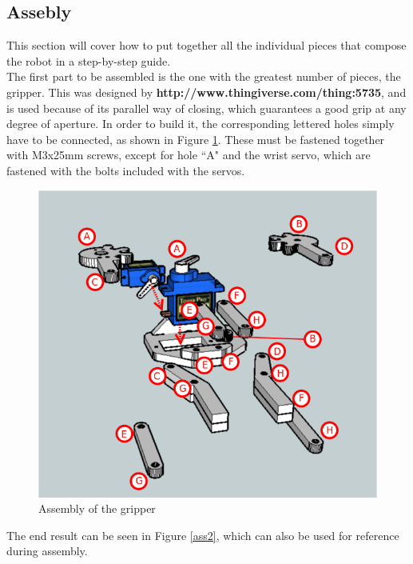 \subsection{Assebly}

This section will cover how to put together all the individual pieces that compose the robot in a step-by-step guide.\\


The first part to be assembled is the one with the greatest number of pieces, the gripper. This was designed by \textbf{http://www.thingiverse.com/thing:5735}, and is used because of its parallel way of closing, which guarantees a good grip at any degree of aperture. In order to build it, the corresponding lettered holes simply have to be connected, as shown in Figure \ref{ass1}. These must be fastened together with M3x25mm screws, except for hole ``A" and the wrist servo, which are fastened with the bolts included with the servos.\\

	\begin{figure}[H]
			\centering
			\includegraphics[scale=0.7]{images/Assembly/1-2.png}
			\caption{Assembly of the gripper }
			\label{ass1}
	\end{figure}
	\bigskip

The end result can be seen in Figure \ref{ass2}, which can also be used for reference during assembly.\\


